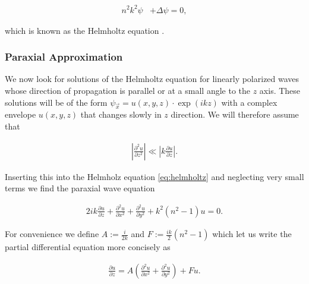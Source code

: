 \begin{align} \label{eq:helmholtz}
    n^2 k^2 \psi & + \Delta \psi = 0,
\end{align}

which is known as the Helmholtz equation \cite{PriciplesOfOptics}.


\subsubsection{Paraxial Approximation} \label{sec:paraxial_equation}

We now look for solutions of the Helmholtz equation for linearly polarized waves whose direction of propagation is parallel or at a small angle to the $z$ axis. These solutions will be of the form $\psi_{\vec{x}} = u(x,y,z) \cdot \exp(i k z)$ with a complex envelope $u(x,y,z)$ that changes slowly in $z$ direction. We will therefore assume that

\begin{align*}
\left| \frac{\partial^2 u}{\partial z^2} \right| \ll \left|  k \frac{\partial u}{\partial z}  \right|.
\end{align*}

Inserting this into the Helmholz equation \eqref{eq:helmholtz} and neglecting very small terms we find the paraxial wave equation

\begin{align*}
2 i k \frac{\partial u}{\partial z} + \frac{\partial^2 u}{\partial x^2} + \frac{\partial^2 u}{\partial y^2} + k^2 (n^2 - 1) u = 0.
\end{align*}

For convenience we define $A := \frac{i}{2k}$ and $F := \frac{ik}{2} (n^2 - 1) $ which let us write the partial differential equation more concisely as

\begin{align} \label{eq:paraxial_wave_equation}
\frac{\partial u}{\partial z} = A \left( \frac{\partial^2 u}{\partial x^2} + \frac{\partial^2 u}{\partial y^2} \right) + F  u.
\end{align}
